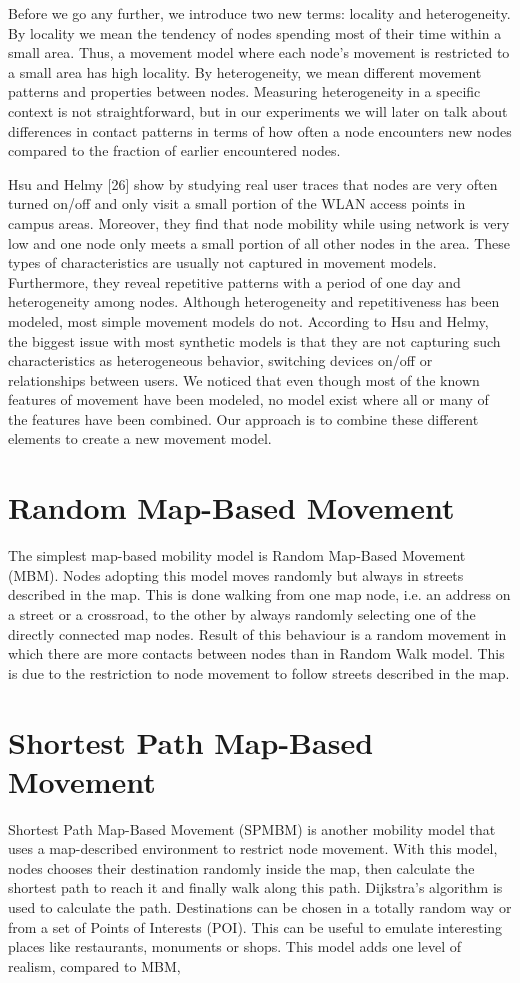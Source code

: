 Before we go any further, we introduce two new terms: locality and heterogeneity. By
locality we mean the tendency of nodes spending most of their time within a small area.
Thus, a movement model where each node's movement is restricted to a small area has
high locality. By heterogeneity, we mean different movement patterns and properties
between nodes. Measuring heterogeneity in a specific context is not straightforward,
but in our experiments we will later on talk about differences in contact patterns in
terms of how often a node encounters new nodes compared to the fraction of earlier
encountered nodes.

Hsu and Helmy [26] show by studying real user traces that nodes are very often turned
on/off and only visit a small portion of the WLAN access points in campus areas.
Moreover, they find that node mobility while using network is very low and one node
only meets a small portion of all other nodes in the area. These types of characteristics
are usually not captured in movement models. Furthermore, they reveal repetitive
patterns with a period of one day and heterogeneity among nodes. Although
heterogeneity and repetitiveness has been modeled, most simple movement models do
not. According to Hsu and Helmy, the biggest issue with most synthetic models is that
they are not capturing such characteristics as heterogeneous behavior, switching
devices on/off or relationships between users.
We noticed that even though most of the known features of movement have been
modeled, no model exist where all or many of the features have been combined. Our
approach is to combine these different elements to create a new movement model.



\section{Random Map-Based Movement}
The simplest map-based mobility model is Random Map-Based Movement (MBM). Nodes adopting this model moves randomly but always in streets described in the map. This is done walking from one map node, i.e. an address on a street or a crossroad, to the other by always randomly selecting one of the directly connected map nodes. Result of this behaviour is a random movement in which there are more contacts between nodes than in Random Walk model. This is due to the restriction to node movement to follow streets described in the map.


\section{Shortest Path Map-Based Movement}
Shortest Path Map-Based Movement (SPMBM) is another mobility model that uses a map-described environment to restrict node movement. With this model, nodes chooses their destination randomly inside the map, then calculate the shortest path to reach it and finally walk along this path. Dijkstra's algorithm is used to calculate the path. Destinations can be chosen in a totally random way or from a set of Points of Interests (POI). This can be useful to emulate interesting places like restaurants, monuments or shops. This model adds one level of realism, compared to MBM, 

